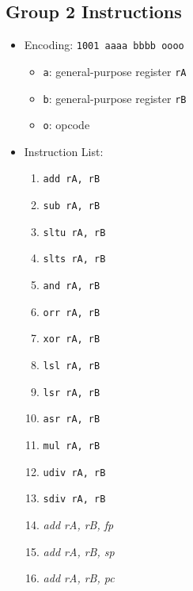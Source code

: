 \documentclass{article}
\begin{document}
	\subsection{Group 2 Instructions}
		\begin{itemize}
		\item Encoding:  \texttt{1001 aaaa bbbb oooo}
			\begin{itemize}
			\item \texttt{a}:  general-purpose register \texttt{rA}
			\item \texttt{b}:  general-purpose register \texttt{rB}
			\item \texttt{o}:  opcode
			\end{itemize}
		\item Instruction List:
			\begin{enumerate}
			\item \texttt{add rA, rB}
			\item \texttt{sub rA, rB}
			\item \texttt{sltu rA, rB}
			\item \texttt{slts rA, rB}

			\item \texttt{and rA, rB}
			\item \texttt{orr rA, rB}
			\item \texttt{xor rA, rB}
			\item \texttt{lsl rA, rB}

			\item \texttt{lsr rA, rB}
			\item \texttt{asr rA, rB}
			\item \texttt{mul rA, rB}
			\item \texttt{udiv rA, rB}

			\item \texttt{sdiv rA, rB}
			\item \textit{add rA, rB, fp}
			\item \textit{add rA, rB, sp}
			\item \textit{add rA, rB, pc}
			\end{enumerate}
		\end{itemize}
\end{document}
